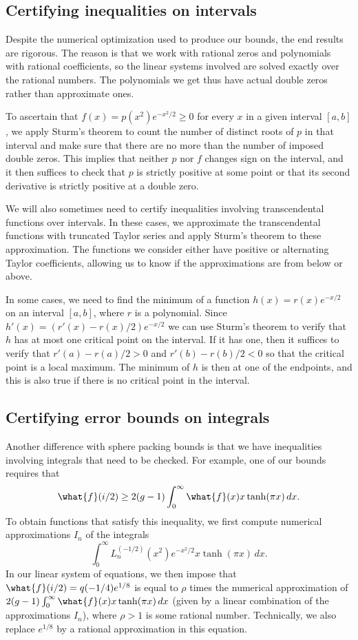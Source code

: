 \documentclass[12pt]{amsart}
\numberwithin{equation}{section}
\begin{document}
\subsection{Certifying inequalities on intervals}

Despite the numerical optimization used to produce our bounds, the end results are rigorous. The reason is that we work with rational zeros and polynomials with rational coefficients, so the linear systems involved are solved exactly over the rational numbers. The polynomials we get thus have actual double zeros rather than approximate ones.

To ascertain that $f(x)=p(x^2)e^{-x^2/2} \geq 0$ for every $x$ in a given interval $[a,b]$, we apply Sturm's theorem to count the number of distinct roots of $p$ in that interval and make sure that there are no more than the number of imposed double zeros. This implies that neither $p$ nor $f$ changes sign on the interval, and it then suffices to check that $p$ is strictly positive at some point or that its second derivative is strictly positive at a double zero.

We will also sometimes need to certify inequalities involving transcendental functions over intervals. In these cases, we approximate the transcendental functions with truncated Taylor series and apply Sturm's theorem to these approximation. The functions we consider either have positive  or alternating Taylor coefficients, allowing us to know if the approximations are from below or above.

In some cases, we need to find the minimum of a function $h(x)=r(x)e^{-x/2}$ on an interval $[a,b]$, where $r$ is a polynomial. Since $h'(x)=(r'(x)-r(x)/2)e^{-x/2}$ we can use Sturm's theorem to verify that $h$ has at most one critical point on the interval. If it has one, then it suffices to verify that $r'(a)-r(a)/2 >0$ and $r'(b)-r(b)/2 < 0$ so that the critical point is a local maximum. The minimum of $h$ is then at one of the endpoints, and this is also true if there is no critical point in the interval. 

\subsection{Certifying error bounds on integrals}

Another difference with sphere packing bounds is that we have inequalities involving integrals that need to be checked. For example, one of our bounds requires that
\begin{equation} \label{eqn:example_integral_ineq}
\what{f}(i/2) \geq 2(g-1)\int_0^\infty \what{f}(x) x\tanh(\pi x) \, dx.
\end{equation}
To obtain functions that satisfy this inequality, we first compute numerical approximations $I_n$ of the integrals 
\[
\int_0^\infty L_n^{(-1/2)}(x^2)e^{-x^2/2} x\tanh(\pi x) \, dx.
\]
In our linear system of equations, we then impose that $\what{f}(i/2)=q(-1/4)e^{1/8}$ is equal to $\rho$ times the numerical approximation of $2(g-1)\int_0^\infty \what{f}(x) x\tanh(\pi x) \, dx$ (given by a linear combination of the approximations $I_n$), where $\rho>1$ is some rational number. Technically, we also replace $e^{1/8}$ by a rational approximation in this equation.
\end{document}
